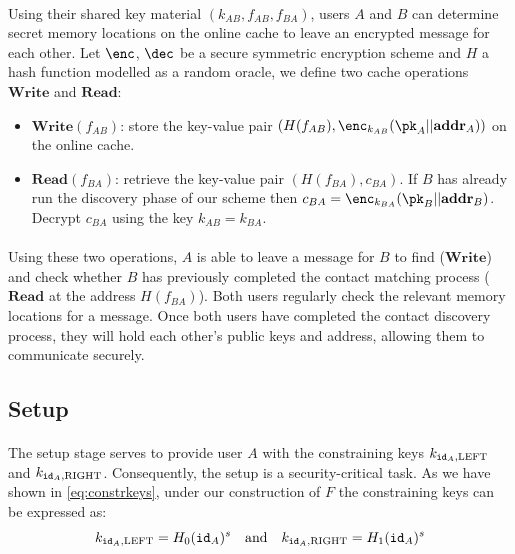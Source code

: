 		\paragraph{} Using their shared key material $(k_{AB}, f_{AB}, f_{BA})$, users $A$ and $B$ can determine secret memory locations on the online cache to leave an encrypted message for each other. Let $\enc$, $\dec$ be a secure symmetric encryption scheme and $H$ a hash function modelled as a random oracle, we define two cache operations $\mathbf{Write}$ and $\mathbf{Read}$:
		\begin{itemize}
			\item $\mathbf{Write}(f_{AB})$: store the key-value pair $(H(f_{AB}), \enc_{k_{AB}}(\pk_A || \addr_A))$ on the online cache.
			\item $\mathbf{Read}(f_{BA})$: retrieve the key-value pair $(H(f_{BA}), c_{BA})$. If $B$ has already run the discovery phase of our scheme then $c_{BA} = \enc_{k_{BA}}(\pk_B||\addr_B)$. Decrypt $c_{BA}$ using the key $k_{AB} = k_{BA}$.
		\end{itemize}
		
		\paragraph{} Using these two operations, $A$ is able to leave a message for $B$ to find ($\mathbf{Write}$) and check whether $B$ has previously completed the contact matching process ($\mathbf{Read}$ at the address $H(f_{BA})$). Both users regularly check the relevant memory locations for a message. Once both users have completed the contact discovery process, they will hold each other's public keys and address, allowing them to communicate securely.
	
	\subsection{Setup}
	\label{sec:setup}
		
		\paragraph{}  The setup stage serves to provide user $A$ with the constraining keys $k_{\mathtt{id}_A,\mathrm{LEFT}}$ and $k_{\mathtt{id}_A,\mathrm{RIGHT}}$. Consequently, the setup is a security-critical task. As we have shown in \autoref{eq:constrkeys}, under our construction of $F$ the constraining keys can be expressed as:
		\begin{equation}
			k_{\mathtt{id}_A,\mathrm{LEFT}} = H_0(\mathtt{id}_A)^s \quad \mathrm{and} \quad k_{\mathtt{id}_A,\mathrm{RIGHT}} = H_1(\mathtt{id}_A)^s
		\end{equation}
		
